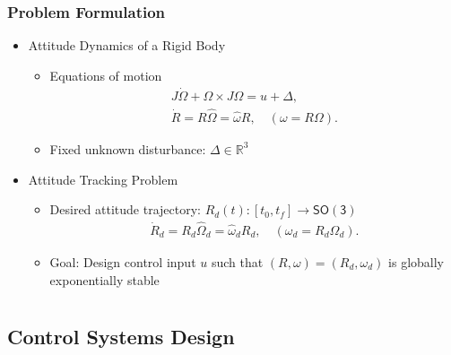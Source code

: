 \documentclass[11pt,professionalfonts,hyperref={pdftex,pdfpagemode=none,pdfstartview=FitH}]{beamer}
\newcommand{\SO}{\ensuremath{\mathsf{SO(3)}}}
\renewcommand{\Re}{\ensuremath{\mathbb{R}}}
\begin{document}
\begin{frame}
\frametitle{Problem Formulation}

\begin{itemize}
    \item Attitude Dynamics of a Rigid Body
    \begin{itemize}
    \item Equations of motion
    \begin{gather*}
J\dot \Omega + \Omega\times J\Omega = u +\Delta,\\
\dot R = R\hat\Omega = \hat\omega R,\quad (\omega=R\Omega).
\end{gather*}
	\item Fixed unknown disturbance: $\Delta\in\Re^3$
    \end{itemize}
\vspace*{0.4cm}\pause    
    \item Attitude Tracking Problem
    \begin{itemize}
    \item Desired attitude trajectory: $R_d(t):[t_0,t_f]\rightarrow\SO$
    \begin{gather*}
    \dot R_d = R_d \hat\Omega_d = \hat\omega_d R_d,\quad (\omega_d=R_d\Omega_d).
    \end{gather*}
    \item Goal: Design control input $u$ such that $(R,\omega)=(R_d,\omega_d)$ is globally exponentially stable
    \end{itemize}
\end{itemize}
\end{frame}


\section*{}
\subsection*{Control Systems Design}
\end{document}
